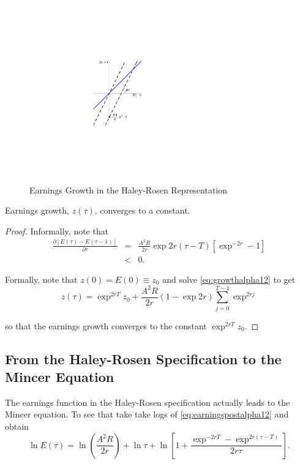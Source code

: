 \begin{center}
\begin{figure}[H]
\caption{Earnings Growth in the Haley-Rosen Representation} \label{fig:halrosgrowth}
\centering
\includegraphics[width=3in, height=3in]{Figures/fig-explode-converge.pdf}
\floatfoot{\begin{small}
\end{small}}
\end{figure}
\end{center}

\begin{claim} \label{claim:halrosdyn}
Earnings growth, $z(\tau)$, converges to a constant.
\end{claim}

\begin{proof}
Informally, note that
\begin{eqnarray}
\frac{\partial \left[ E(\tau) - E(\tau - 1) \right] }{\partial \tau} &=& \frac{A^2 R}{2r} \exp{2r(\tau - T)} \left[ \exp^{-2r} - 1 \right] \nonumber \\
&<& 0.
\end{eqnarray}

\noindent Formally, note that $z(0) = E(0) \equiv z_{0}$ and solve \eqref{eq:growthalpha12} to get
\begin{equation}
z(\tau) = \exp^{2rT} z_{0} + \frac{A^2 R}{2r} \left( 1 - \exp{2r} \right) \sum \limits _{j=0} ^{T-1} \exp^{2rj}
\end{equation}

\noindent so that the earnings growth converges to the constant $\exp^{2rT} z_{0}$.
\end{proof}

\subsection{From the Haley-Rosen Specification to the Mincer Equation}
The earnings function in the Haley-Rosen specification actually leads to the Mincer equation. To see that take take logs of \eqref{eq:earningspostalpha12} and obtain
\begin{equation}
\ln E(\tau) = \ln \left( \frac{A^2 R}{ 2r} \right) + \ln \tau + \ln \left[ 1 + \frac{\exp^{-2rT} - \exp^{2r(\tau - T)} }{2r \tau} \right]. \label{eq:logs}
\end{equation}

